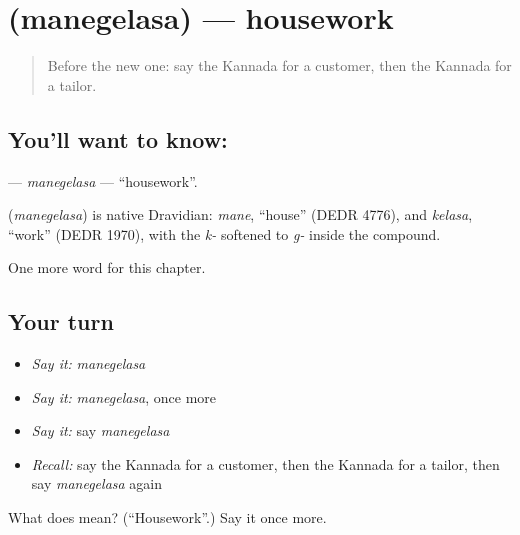 \section[\texorpdfstring{\kn{ಮನೆಗೆಲಸ} (manegelasa)}{ಮನೆಗೆಲಸ (manegelasa)}]{ (manegelasa) — housework}

\label{lesson:KA-C194-manegelasa}



\begin{quote}
Before the new one: say the Kannada for a customer, then the Kannada for a tailor.
\end{quote}

\subsection*{You'll want to know: }
\textbf{} — \emph{manegelasa} — \textquotedblleft{}housework\textquotedblright{}.

\begin{cousinweb}
\textbf{} (\emph{manegelasa}) is native Dravidian: \emph{mane}, \textquotedblleft{}house\textquotedblright{} (DEDR 4776), and \emph{kelasa}, \textquotedblleft{}work\textquotedblright{} (DEDR 1970), with the \emph{k-} softened to \emph{g-} inside the compound.
\end{cousinweb}

\begin{grammarlens}[title={What you've built}]
One more word for this chapter.
\end{grammarlens}

\subsection*{Your turn}
\begin{itemize}
\raggedright
  \item \emph{Say it:} \emph{manegelasa}
  \item \emph{Say it:} \emph{manegelasa}, once more
  \item \emph{Say it:} say \emph{manegelasa}
  \item \emph{Recall:} say the Kannada for a customer, then the Kannada for a tailor, then say \emph{manegelasa} again
\end{itemize}

\begin{tcolorbox}[breakable,colback=teal!4,colframe=teal!35!black,title={Before you move on}]
What does  mean? (\textquotedblleft{}Housework\textquotedblright{}.) Say it once more.
\end{tcolorbox}
